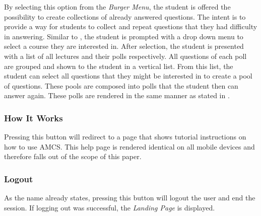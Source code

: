 By selecting this option from the \emph{Burger Menu}, the student is offered the possibility to create collections of already answered questions. The intent is to provide a way for students to collect and repeat questions that they had difficulty in answering.
Similar to \todosct, the student is prompted with a drop down menu to select a course they are interested in. After selection, the student is presented with a list of all lectures and their polls respectively. All questions of each poll are grouped and shown to the student in a vertical list. From this list, the student can select all questions that they might be interested in to create a pool of questions.
These pools are composed into polls that the student then can answer again. These polls are rendered in the same manner as stated in .


\subsubsection{How It Works}

Pressing this button will redirect to a page that shows tutorial instructions on how to use AMCS.
This help page is rendered identical on all mobile devices and therefore falls out of the scope of this paper.

\subsubsection{Logout}

As the name already states, pressing this button will logout the user and end the session. 
If logging out was successful, the \emph{Landing Page} is displayed.




